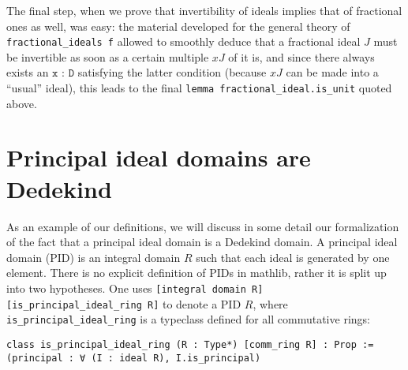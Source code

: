 \documentclass[a4paper,USenglish,cleveref, autoref, thm-restate]{lipics-v2021}
\newcommand{\lean}[1]{\texttt{#1}\xspace} %
\newcommand{\mathlib}{\textsf{mathlib}\xspace}
\begin{document}
The final step, when we prove that invertibility of ideals implies that of fractional ones as well, was easy: the material developed for the general theory of \lean{fractional\_ideals f} allowed to smoothly deduce that a fractional ideal $J$ must be invertible as soon as a certain multiple $xJ$ of it is, and since there always exists an $\lean{x : D}$ satisfying the latter condition (because $xJ$ can be made into a ``usual'' ideal), this leads to the final \lean{lemma fractional\_ideal.is\_unit} quoted above.
%
\section{Principal ideal domains are Dedekind}

As an example of our definitions, we will discuss in some detail our formalization of the fact that a principal ideal domain is a Dedekind domain.
A principal ideal domain (PID) is an integral domain $R$ such that each ideal is generated by one element.
There is no explicit definition of PIDs in \mathlib, rather it is split up into two hypotheses.
One uses \lean{[integral domain R] [is\_principal\_ideal\_ring R]} to denote a PID $R$,
where \lean{is\_principal\_ideal\_ring} is a typeclass defined for all commutative rings:
\begin{lstlisting}
class is_principal_ideal_ring (R : Type*) [comm_ring R] : Prop :=
(principal : ∀ (I : ideal R), I.is_principal)
\end{lstlisting}
\end{document}
